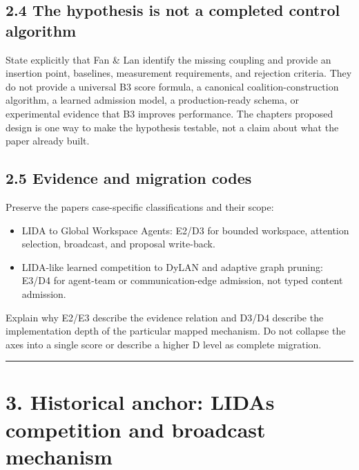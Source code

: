 \subsection{2.4 The hypothesis is not a completed control algorithm}\label{24-the-hypothesis-is-not-a-completed-control-algorithm}

State explicitly that Fan \& Lan identify the missing coupling and provide an insertion point, baselines, measurement requirements, and rejection criteria. They do not provide a universal B3 score formula, a canonical coalition-construction algorithm, a learned admission model, a production-ready schema, or experimental evidence that B3 improves performance. The chapter\textquotesingle s proposed design is one way to make the hypothesis testable, not a claim about what the paper already built.

\subsection{2.5 Evidence and migration codes}\label{25-evidence-and-migration-codes}

Preserve the paper\textquotesingle s case-specific classifications and their scope:

\begin{itemize}
\tightlist
\item
  LIDA to Global Workspace Agents: E2/D3 for bounded workspace, attention selection, broadcast, and proposal write-back.
\item
  LIDA-like learned competition to DyLAN and adaptive graph pruning: E3/D4 for agent-team or communication-edge admission, not typed content admission.
\end{itemize}

Explain why E2/E3 describe the evidence relation and D3/D4 describe the implementation depth of the particular mapped mechanism. Do not collapse the axes into a single score or describe a higher D level as complete migration.

\begin{center}\rule{0.5\linewidth}{0.5pt}\end{center}

\section{3. Historical anchor: LIDA\textquotesingle s competition and broadcast mechanism}\label{3-historical-anchor-lidas-competition-and-broadcast-mechanism}

